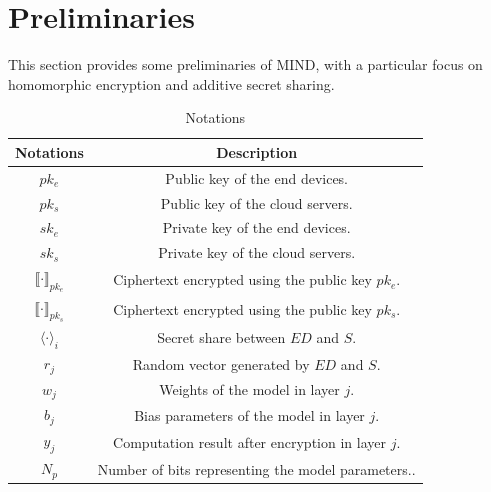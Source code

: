 \documentclass[conference]{IEEEtran}
\newcommand{\DEnc}{\texttt{DEnc}}
\newcommand{\PEnc}{\texttt{PEnc}}
\begin{document}
\section{Preliminaries}
This section provides some preliminaries of MIND, with a particular focus on homomorphic encryption and additive secret sharing.
\begin{table}[h]
\centering
\caption{Notations}
\label{table:notations}
\begin{tabular}{c|c}
\toprule
\textbf{Notations} & \textbf{Description} \\ 
\midrule
$pk_e$                                   & Public key of the end devices. \\
$pk_s$                                   & Public key of the cloud servers. \\
$sk_e$                                   & Private key of the end devices. \\
$sk_s$                                   & Private key of the cloud servers. \\
$\llbracket \cdot \rrbracket_{pk_e}$     & Ciphertext encrypted using the public key $pk_e$. \\
$\llbracket \cdot \rrbracket_{pk_s}$     & Ciphertext encrypted using the public key $pk_s$. \\
$\langle \cdot \rangle_i$                & Secret share between $ED$ and $S$. \\
$r_j$                                    & Random vector generated by 
$ED$ and $S$. \\
$w_j$                                      & Weights of the model in layer $j$. \\
$b_j$                                      & Bias parameters of the model in layer $j$. \\
$y_j$                                    & Computation result after encryption in layer $j$.\\
$N_{p}$          & Number of bits representing the model parameters..\\

\end{tabular}
\end{table}
\end{document}
